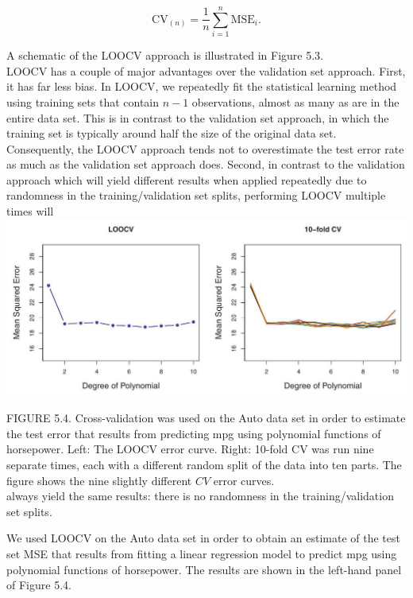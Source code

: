 \documentclass[10pt]{article}
\begin{document}
\begin{equation*}
\mathrm{CV}_{(n)}=\frac{1}{n} \sum_{i=1}^{n} \mathrm{MSE}_{i} . \tag{5.1}
\end{equation*}


A schematic of the LOOCV approach is illustrated in Figure 5.3.\\
LOOCV has a couple of major advantages over the validation set approach. First, it has far less bias. In LOOCV, we repeatedly fit the statistical learning method using training sets that contain $n-1$ observations, almost as many as are in the entire data set. This is in contrast to the validation set approach, in which the training set is typically around half the size of the original data set. Consequently, the LOOCV approach tends not to overestimate the test error rate as much as the validation set approach does. Second, in contrast to the validation approach which will yield different results when applied repeatedly due to randomness in the training/validation set splits, performing LOOCV multiple times will\\
\includegraphics[max width=\textwidth, center]{2025_05_05_efe77898333945044de4g-195}

FIGURE 5.4. Cross-validation was used on the Auto data set in order to estimate the test error that results from predicting mpg using polynomial functions of horsepower. Left: The LOOCV error curve. Right: 10-fold CV was run nine separate times, each with a different random split of the data into ten parts. The figure shows the nine slightly different $C V$ error curves.\\
always yield the same results: there is no randomness in the training/validation set splits.

We used LOOCV on the Auto data set in order to obtain an estimate of the test set MSE that results from fitting a linear regression model to predict mpg using polynomial functions of horsepower. The results are shown in the left-hand panel of Figure 5.4.
\end{document}
